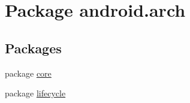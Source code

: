\hypertarget{namespaceandroid_1_1arch}{}\section{Package android.\+arch}
\label{namespaceandroid_1_1arch}
\subsection*{Packages}
\begin{DoxyCompactItemize}
\item 
package \mbox{\hyperlink{namespaceandroid_1_1arch_1_1core}{core}}
\item 
package \mbox{\hyperlink{namespaceandroid_1_1arch_1_1lifecycle}{lifecycle}}
\end{DoxyCompactItemize}
